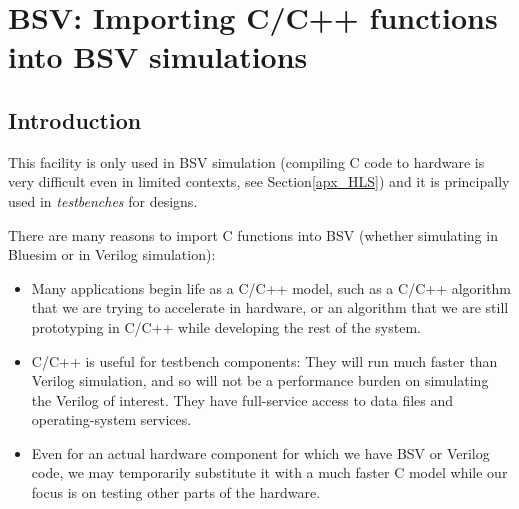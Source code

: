 

\chapter{BSV: Importing C/C++ functions into BSV simulations}


\setcounter{page}{1}
\renewcommand{\thepage}{\Alph{chapter}-\arabic{page}}

\label{apx_BSV_importing_C}

\label{Sec_Importing_C}


\section{Introduction}


This facility is only used in BSV simulation (compiling C code to
hardware is very difficult even in limited contexts, see
Section\ref{apx_HLS}) and it is principally used in \emph{testbenches}
for designs.

There are many reasons to import C functions into BSV (whether
simulating in Bluesim or in Verilog simulation):

\begin{itemize}

 \item Many applications begin life as a C/C++ model, such as a C/C++
       algorithm that we are trying to accelerate in hardware, or an
       algorithm that we are still prototyping in C/C++ while
       developing the rest of the system.

 \item C/C++ is useful for testbench components: They will run much
       faster than Verilog simulation, and so will not be a
       performance burden on simulating the Verilog of interest.  They
       have full-service access to data files and operating-system
       services.

 \item Even for an actual hardware component for which we have BSV or
       Verilog code, we may temporarily substitute it with a much
       faster C model while our focus is on testing other parts of the
       hardware.

\end{itemize}

